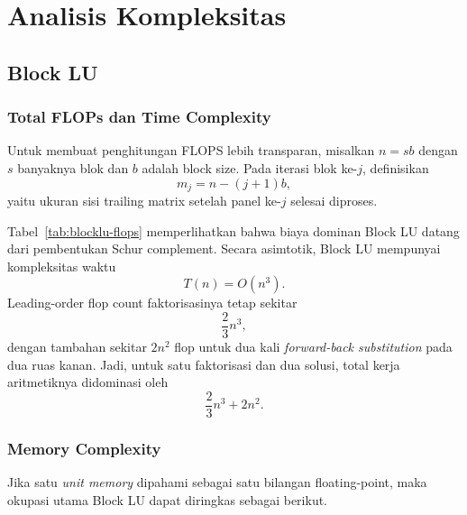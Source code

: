 \documentclass[12pt,a4paper]{article}
\begin{document}
\section{Analisis Kompleksitas}
\subsection{Block LU}
\subsubsection*{Total FLOPs dan Time Complexity}
Untuk membuat penghitungan FLOPS lebih transparan, misalkan $n = sb$ dengan $s$ banyaknya blok dan $b$ adalah block size. Pada iterasi blok ke-$j$, definisikan
\[
m_j = n - (j+1)b,
\]
yaitu ukuran sisi trailing matrix setelah panel ke-$j$ selesai diproses.

\begin{table}[h]
\centering
\caption{Akumulasi FLOPS per fase pada Block LU.}
\label{tab:blocklu-flops}
\end{table}

Tabel~\ref{tab:blocklu-flops} memperlihatkan bahwa biaya dominan Block LU datang dari pembentukan Schur complement. Secara asimtotik, Block LU mempunyai kompleksitas waktu
\[
T(n)=O(n^3).
\]
Leading-order flop count faktorisasinya tetap sekitar
\[
\frac{2}{3}n^3,
\]
dengan tambahan sekitar $2n^2$ flop untuk dua kali \emph{forward-back substitution} pada dua ruas kanan. Jadi, untuk satu faktorisasi dan dua solusi, total kerja aritmetiknya didominasi oleh
\[
\frac{2}{3}n^3 + 2n^2.
\]

\subsubsection*{Memory Complexity}
Jika satu \emph{unit memory} dipahami sebagai satu bilangan floating-point, maka okupasi utama Block LU dapat diringkas sebagai berikut.
\end{document}
